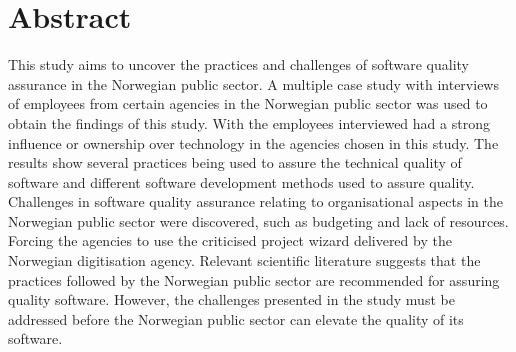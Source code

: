 \chapter*{Abstract}
This study aims to uncover the practices and challenges of software quality assurance in the Norwegian public sector. A multiple case study with interviews of employees from certain agencies in the Norwegian public sector was used to obtain the findings of this study. With the employees interviewed had a strong influence or ownership over technology in the agencies chosen in this study. The results show several practices being used to assure the technical quality of software and different software development methods used to assure quality. Challenges in software quality assurance relating to organisational aspects in the Norwegian public sector were discovered, such as budgeting and lack of resources. Forcing the agencies to use the criticised project wizard delivered by the Norwegian digitisation agency. Relevant scientific literature suggests that the practices followed by the Norwegian public sector are recommended for assuring quality software. However, the challenges presented in the study must be addressed before the Norwegian public sector can elevate the quality of its software.